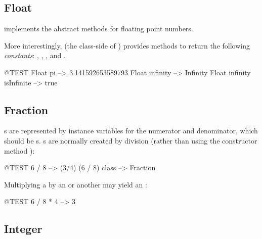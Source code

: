 \documentclass[a4paper,10pt,twoside]{book}
\begin{document}

\subsection{Float}

 implements the abstract  methods for floating point numbers.

More interestingly,  (\ie the class-side of ) provides methods to return the following \emph{constants}: , , , and .

\begin{code}{@TEST}
Float pi                      --> 3.141592653589793
Float infinity               --> Infinity
Float infinity isInfinite --> true
\end{code}

\subsection{Fraction}

s are represented by instance variables for the numerator and denominator, which should be s.
s are normally created by  division (rather than using the constructor method ):

\begin{code}{@TEST}
6 / 8             --> (3/4)
(6 / 8) class --> Fraction
\end{code}

Multiplying a  by an  or another  may yield an :

\begin{code}{@TEST}
6 / 8 * 4 --> 3
\end{code}


\subsection{Integer}
\end{document}
